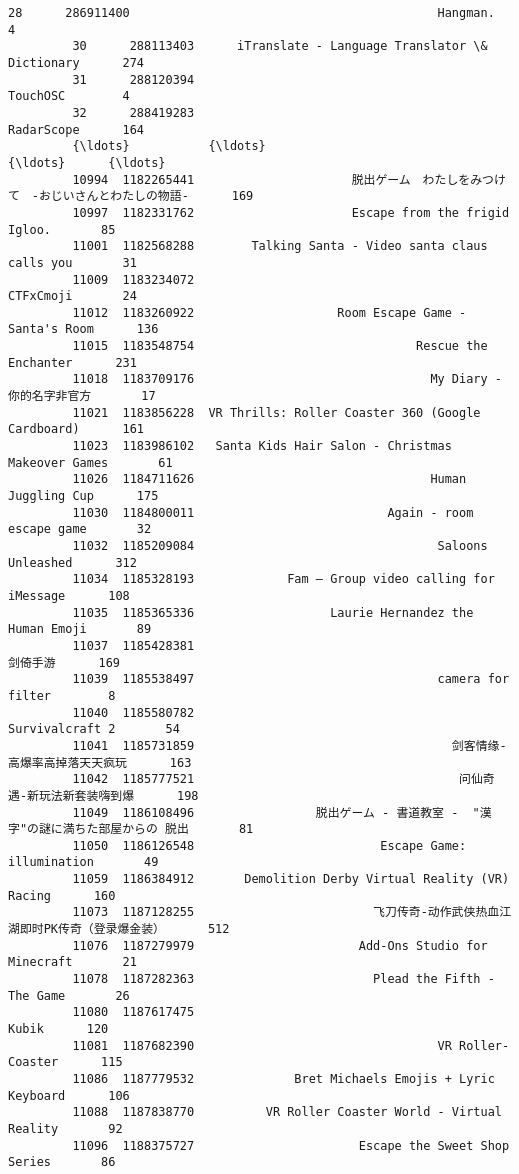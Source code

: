 \documentclass[11pt]{article}
\begin{document}
\begin{Verbatim}[commandchars=\\\{\}]
         28      286911400                                           Hangman.        4   
         30      288113403      iTranslate - Language Translator \& Dictionary      274   
         31      288120394                                           TouchOSC        4   
         32      288419283                                         RadarScope      164   
         {\ldots}           {\ldots}                                                {\ldots}      {\ldots}   
         10994  1182265441                      脱出ゲーム　わたしをみつけて　-おじいさんとわたしの物語-      169   
         10997  1182331762                      Escape from the frigid Igloo.       85   
         11001  1182568288        Talking Santa - Video santa claus calls you       31   
         11009  1183234072                                          CTFxCmoji       24   
         11012  1183260922                    Room Escape Game - Santa's Room      136   
         11015  1183548754                               Rescue the Enchanter      231   
         11018  1183709176                                 My Diary - 你的名字非官方       17   
         11021  1183856228  VR Thrills: Roller Coaster 360 (Google Cardboard)      161   
         11023  1183986102   Santa Kids Hair Salon - Christmas Makeover Games       61   
         11026  1184711626                                 Human Juggling Cup      175   
         11030  1184800011                           Again - room escape game       32   
         11032  1185209084                                  Saloons Unleashed      312   
         11034  1185328193             Fam — Group video calling for iMessage      108   
         11035  1185365336                   Laurie Hernandez the Human Emoji       89   
         11037  1185428381                                               剑倚手游      169   
         11039  1185538497                                  camera for filter        8   
         11040  1185580782                                    Survivalcraft 2       54   
         11041  1185731859                                    剑客情缘-高爆率高掉落天天疯玩      163   
         11042  1185777521                                     问仙奇遇-新玩法新套装嗨到爆      198   
         11049  1186108496                 脱出ゲーム - 書道教室 -  "漢字"の謎に満ちた部屋からの 脱出       81   
         11050  1186126548                          Escape Game: illumination       49   
         11059  1186384912       Demolition Derby Virtual Reality (VR) Racing      160   
         11073  1187128255                         飞刀传奇-动作武侠热血江湖即时PK传奇（登录爆金装）      512   
         11076  1187279979                       Add-Ons Studio for Minecraft       21   
         11078  1187282363                         Plead the Fifth - The Game       26   
         11080  1187617475                                              Kubik      120   
         11081  1187682390                                  VR Roller-Coaster      115   
         11086  1187779532              Bret Michaels Emojis + Lyric Keyboard      106   
         11088  1187838770          VR Roller Coaster World - Virtual Reality       92   
         11096  1188375727                       Escape the Sweet Shop Series       86   
         

\end{Verbatim}
\end{document}
